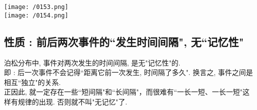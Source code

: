 \documentclass[UTF8]{ctexart}
\begin{document}
		\texttt{[image: /0153.png]} \\	
		\texttt{[image: /0154.png]} \\	
	
	
	
	\subsection{性质 : 前后两次事件的``发生时间间隔", 无``记忆性"}
	
	泊松分布中, 事件对两次发生的时间间隔, 是无"记忆性"的. \\
	即 : 后一次事件不会记得``距离它前一次发生, 时间隔了多久". 换言之, 事件之间是相互``独立"的关系. \\
	正因此, 就一定存在一些``短间隔"和``长间隔"，而很难有``一长一短、一长一短"这样有规律的出现. 否则就不叫"无记忆"了. 
	
	
	
	
	
	
\end{document}
